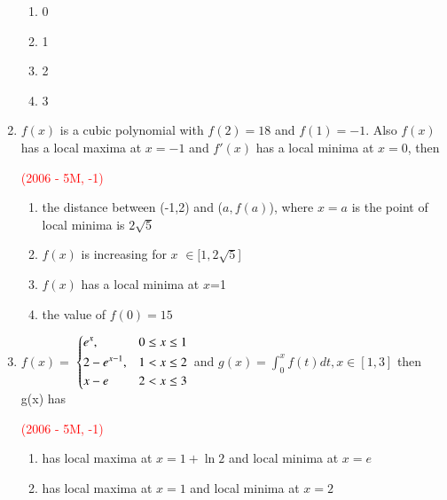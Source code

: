 \documentclass[journal,12pt,twocolumn]{IEEEtran}
\theoremstyle{remark}
\begin{document}
\begin{enumerate}[start = 7]
{\begin{flushleft}
\begin{enumerate}
                \item 0 
                \item 1
                \item 2
                \item 3
            \end{enumerate}
        \end{flushleft}
        }
    \item{
        \begin{flushleft}
            $f(x)$ is a cubic polynomial with  $f(2)=18$ and $f(1)=-1$. Also $f(x)$ has a local maxima at $x=-1$ and $f'(x)$ has a local minima at $x=0$, then
            \begin{flushright}
                \textcolor{red}{(2006 - 5M, -1)}
            \end{flushright}
            \begin{enumerate}
                \item the distance between (-1,2) and ($a,f(a)$), where $x=a$ is the point of local minima is $2\sqrt{5}$
                \item $f(x)$ is increasing for $x$ $\in [1,2\sqrt{5}$]
                \item $f(x)$ has a local minima at $x$=1
                \item the value of $f(0)=15$
            \end{enumerate}
        \end{flushleft}
        }
    \item{
        \begin{flushleft}
            $f(x) = $    
            $\begin{dcases}%
                e^x, & 0 \leq x\leq 1 \\
                2-e^{x-1}, & 1 < x\leq 2 \\
                x-e & 2 < x\leq 3 \\
            \end{dcases}$ and $g(x) = \int_0^{x}f(t)dt, x \in[1,3]$ then g(x) has
            \begin{flushright}
                \textcolor{red}{(2006 - 5M, -1)}
            \end{flushright}
            \begin{enumerate}
                \item has local maxima at $x = 1+ \ln{2}$ and local minima at $x = e$
                \item has local maxima at $x = 1$ and local minima at $x = 2$

\end{enumerate}
\end{flushleft}}
\end{enumerate}
\end{document}
